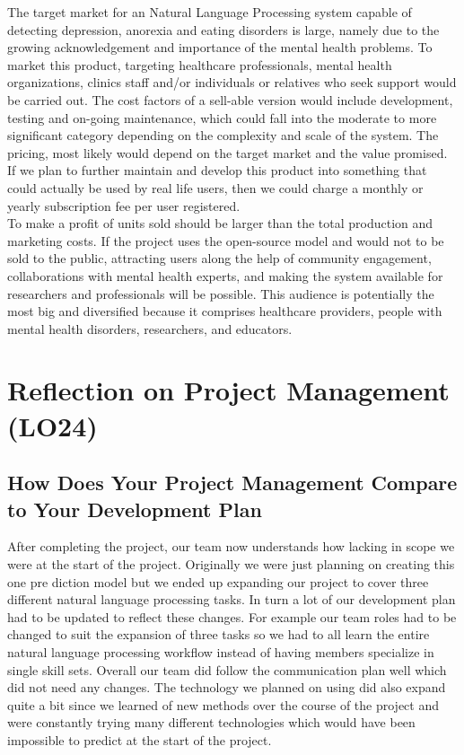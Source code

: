 \documentclass{article}
\begin{document}
The target market  for an Natural Language Processing system capable of detecting depression, anorexia and eating disorders is large, namely due to the growing acknowledgement and importance of the mental health problems. To market this product, targeting healthcare professionals, mental health organizations, clinics staff and/or individuals or relatives who seek support would be carried out. The cost factors of a sell-able version would include development, testing and on-going maintenance, which could fall into the moderate to more significant category depending on the complexity and scale of the system. The pricing, most likely would depend on the target market and the value promised.  If we plan to further maintain and develop this product into something that could actually be used by real life users, then we could charge a monthly or yearly subscription fee per user registered. \\ To make a profit of units sold should be larger than the total production and marketing costs. If the project uses the open-source model and would not to be sold to the public, attracting users along the help of community engagement, collaborations with mental health experts, and making the system available for researchers and professionals will be possible. This audience is potentially the most big and diversified because it comprises healthcare providers, people with mental health disorders, researchers, and educators.

\section{Reflection on Project Management (LO24)}


\subsection{How Does Your Project Management Compare to Your Development Plan}

After completing the project, our team now understands how lacking in scope we were at the start of the project. Originally we were just planning on creating this one pre  diction model but we ended up expanding our project to cover three different natural language processing tasks. In turn a lot of our development plan had to be updated to reflect these changes. For example our team roles had to be changed to suit the expansion of three tasks so we had to all learn the entire natural language processing workflow instead of having members specialize in single skill sets. Overall our team did follow the communication plan well which did not need any changes. The technology we planned on using did also expand quite a bit since we learned of new methods over the course of the project and were constantly trying many different technologies which would have been impossible to predict at the start of the project.
\end{document}
